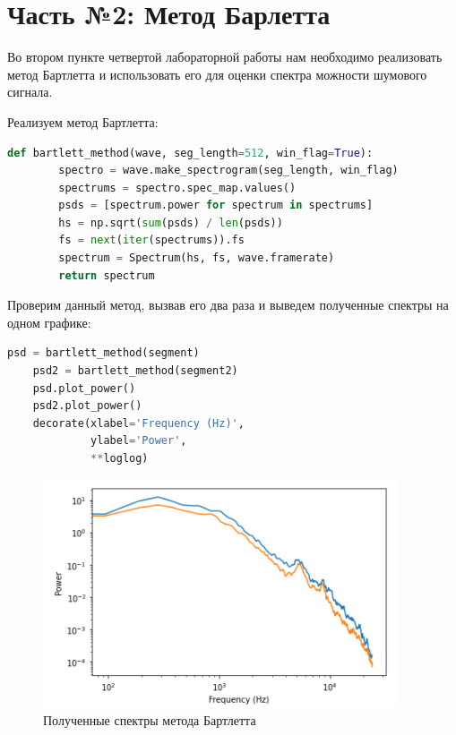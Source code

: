 \documentclass[a4paper]{article}
\begin{document}
    \newpage
        \section{Часть №2: Метод Барлетта}
           Во втором пункте четвертой лабораторной работы нам необходимо реализовать метод Бартлетта и использовать его для оценки спектра можности шумового сигнала.
           
           Реализуем метод Бартлетта:
           
\begin{lstlisting}[language=Python, caption= Реализованный метод Бартлетта]
    def bartlett_method(wave, seg_length=512, win_flag=True):
        spectro = wave.make_spectrogram(seg_length, win_flag)
        spectrums = spectro.spec_map.values()
        psds = [spectrum.power for spectrum in spectrums]
        hs = np.sqrt(sum(psds) / len(psds))
        fs = next(iter(spectrums)).fs
        spectrum = Spectrum(hs, fs, wave.framerate)
        return spectrum
\end{lstlisting}      
           
           Проверим данный метод, вызвав его два раза и выведем полученные спектры на одном графике:
           
\begin{lstlisting}[language=Python, caption= Получение спектограммы для сегмента]
    psd = bartlett_method(segment)
    psd2 = bartlett_method(segment2)
    psd.plot_power()
    psd2.plot_power()
    decorate(xlabel='Frequency (Hz)', 
             ylabel='Power', 
             **loglog)
\end{lstlisting}               
            
            \begin{figure}[H]
                \centering
                \includegraphics{ex_2_bartlett_spectr.png}
                \caption{Полученные спектры метода Бартлетта}
                \label{fig:ex_2_bartlett_spectr}
            \end{figure}
            
\end{document}
